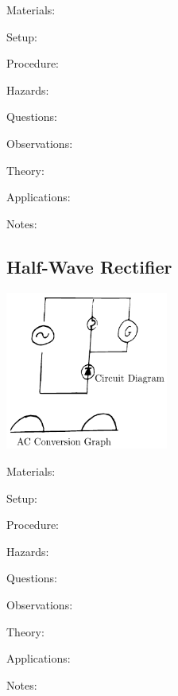 \begin{multicols}{2}
\begin{description*}
\item[Materials:]{}
\item[Setup:]{}
\item[Procedure:]{}
\item[Hazards:]{}
\item[Questions:]{}
\item[Observations:]{}
\item[Theory:]{}
\item[Applications:]{}
\item[Notes:]{}
\end{description*}

\subsection{Half-Wave Rectifier}

\begin{center}
\includegraphics[width=0.4\textwidth]{./img/half-wave-rectifier.png}
\end{center}

\begin{description*}
\item[Materials:]{}
\item[Setup:]{}
\item[Procedure:]{}
\item[Hazards:]{}
\item[Questions:]{}
\item[Observations:]{}
\item[Theory:]{}
\item[Applications:]{}
\item[Notes:]{}
\end{description*}



\end{multicols}

\pagebreak